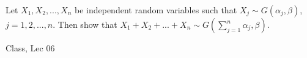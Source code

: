\begin{samepage}
\begin{ex}
Let $X_1, X_2, ..., X_n$ be independent random variables such that  $X_j \sim G(\alpha_j, \beta)$, $j = 1, 2, ...,n$.
Then show that $X_1 +  X_2 + ... + X_n \sim G(\sum_{j=1}^n \alpha_j , \beta)$.
\end{ex}
\begin{source}
Class, Lec 06
\end{source}
\end{samepage}

